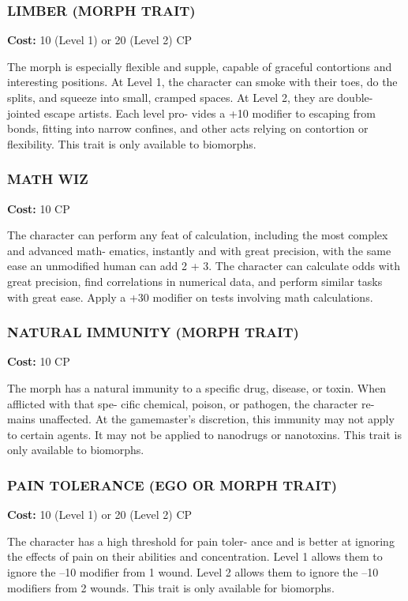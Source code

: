 \subsubsection{LIMBER (MORPH TRAIT)}
\textbf{Cost:} 10 (Level 1) or 20 (Level 2) CP

The morph is especially flexible and supple, capable
of graceful contortions and interesting positions. At
Level 1, the character can smoke with their toes, do the
splits, and squeeze into small, cramped spaces. At Level
2, they are double-jointed escape artists. Each level pro-
vides a +10 modifier to escaping from bonds, fitting into
narrow confines, and other acts relying on contortion or
flexibility. This trait is only available to biomorphs.

\subsubsection{MATH WIZ}
\textbf{Cost:} 10 CP

The character can perform any feat of calculation,
including the most complex and advanced math-
ematics, instantly and with great precision, with the
same ease an unmodified human can add 2 + 3. The
character can calculate odds with great precision, find
correlations in numerical data, and perform similar
tasks with great ease. Apply a +30 modifier on tests
involving math calculations.

\subsubsection{NATURAL IMMUNITY (MORPH TRAIT)}
\textbf{Cost:} 10 CP

The morph has a natural immunity to a specific
drug, disease, or toxin. When afflicted with that spe-
cific chemical, poison, or pathogen, the character re-
mains unaffected. At the gamemaster’s discretion, this
immunity may not apply to certain agents. It may not
be applied to nanodrugs or nanotoxins. This trait is
only available to biomorphs.

\subsubsection{PAIN TOLERANCE (EGO OR MORPH TRAIT)}
\textbf{Cost:} 10 (Level 1) or 20 (Level 2) CP

The character has a high threshold for pain toler-
ance and is better at ignoring the effects of pain on
their abilities and concentration. Level 1 allows them
to ignore the –10 modifier from 1 wound. Level
2 allows them to ignore the –10 modifiers from 2
wounds. This trait is only available for biomorphs.

